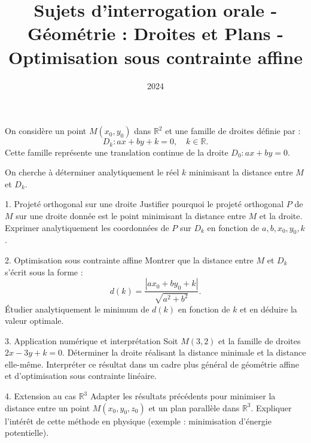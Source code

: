 \documentclass[10pt,a4paper]{article}
\title{Sujets d'interrogation orale - Géométrie : Droites et Plans - Optimisation sous contrainte affine}
\author{}
\date{2024}
\begin{document}
\maketitle

On considère un point $M(x_0, y_0)$ dans $\mathbb{R}^2$ et une famille de droites définie par :
$$
D_k : ax + by + k = 0, \quad k \in \mathbb{R}.
$$
Cette famille représente une translation continue de la droite $D_0 : ax + by = 0$.

On cherche à déterminer analytiquement le réel $k$ minimisant la distance entre $M$ et $D_k$.


1. Projeté orthogonal sur une droite
  \ql Justifier pourquoi le projeté orthogonal $P$ de $M$ sur une droite donnée est le point minimisant la distance entre $M$ et la droite.
  \ql Exprimer analytiquement les coordonnées de $P$ sur $D_k$ en fonction de $a, b, x_0, y_0, k$.

2. Optimisation sous contrainte affine
  \ql Montrer que la distance entre $M$ et $D_k$ s'écrit sous la forme :
   $$
   d(k) = \frac{|ax_0 + by_0 + k|}{\sqrt{a^2 + b^2}}.
   $$
  \ql Étudier analytiquement le minimum de $d(k)$ en fonction de $k$ et en déduire la valeur optimale.

3. Application numérique et interprétation
  \ql Soit $M(3,2)$ et la famille de droites $2x - 3y + k = 0$. Déterminer la droite réalisant la distance minimale et la distance elle-même.
  \ql Interpréter ce résultat dans un cadre plus général de géométrie affine et d'optimisation sous contrainte linéaire.

4. Extension au cas $\mathbb{R}^3$
  \ql Adapter les résultats précédents pour minimiser la distance entre un point $M(x_0, y_0, z_0)$ et un plan parallèle dans $\mathbb{R}^3$.
  \ql Expliquer l'intérêt de cette méthode en physique (exemple : minimisation d'énergie potentielle).
\end{document}
